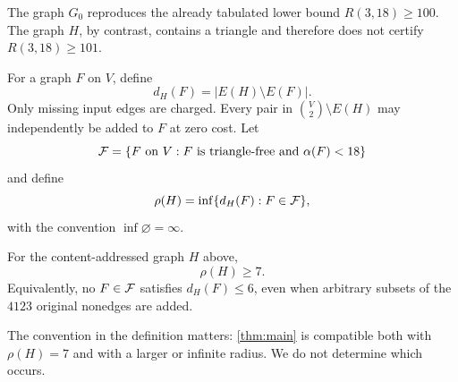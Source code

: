 The graph \(G_0\) reproduces the already tabulated lower bound
\(R(3,18)\ge100\).  The graph \(H\), by contrast, contains a triangle and
therefore does not certify \(R(3,18)\ge101\).

\begin{definition}
For a graph \(F\) on \(V\), define
\[
 d_H(F)=|E(H)\setminus E(F)|.
\]
Only missing input edges are charged.  Every pair in
\(\binom V2\setminus E(H)\) may independently be added to \(F\) at zero cost.
Let
\[
 \mathcal F=\{F\text{ on }V:F\text{ is triangle-free and }\alpha(F)<18\}
\]
and define
\[
 \rho(H)=\inf\{d_H(F):F\in\mathcal F\},
\]
with the convention \(\inf\varnothing=\infty\).
\end{definition}

\begin{theorem}\label{thm:main}
For the content-addressed graph \(H\) above,
\[
  \rho(H)\ge 7.
\]
Equivalently, no \(F\in\mathcal F\) satisfies \(d_H(F)\le6\), even when arbitrary
subsets of the \(4123\) original nonedges are added.
\end{theorem}

The convention in the definition matters: \cref{thm:main} is compatible
both with \(\rho(H)=7\) and with a larger or infinite radius.  We do not
determine which occurs.

